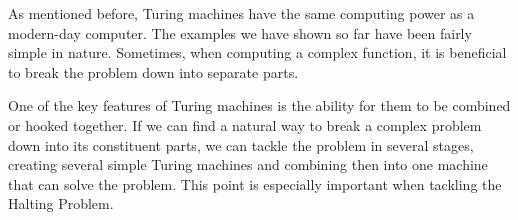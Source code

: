\documentclass[../../../include/open-logic-section]{subfiles}
\begin{document}

\begin{explain}
As mentioned before, Turing machines have the same computing
power as a modern-day computer. The examples we have shown
so far have been fairly simple in nature. Sometimes, when computing
a complex function, it is beneficial to break the problem down into 
separate parts.

One of the key features of Turing machines is the ability for them to
be combined or hooked together. If we can find a natural way to break
a complex problem down into its constituent parts, we can tackle the
problem in several stages, creating several simple Turing machines and
combining then into one machine that can solve the problem. This point
is especially important when tackling the Halting Problem.
\end{explain}
\end{document}
